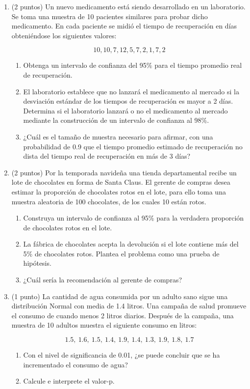 \documentclass[12pt]{article}
\begin{document}
\begin{enumerate}
    \item (2 puntos) Un nuevo medicamento está siendo desarrollado en un laboratorio. Se toma una muestra de 10 pacientes similares para probar dicho medicamento. En cada paciente se midió el tiempo de recuperación en días obteniéndose los siguientes valores:

    \[
    10, 10, 7, 12, 5, 7, 2, 1, 7, 2
    \]

    \begin{enumerate}
        \item Obtenga un intervalo de confianza del 95\% para el tiempo promedio real de recuperación.
        \item El laboratorio establece que no lanzará el medicamento al mercado si la desviación estándar de los tiempos de recuperación es mayor a 2 días. Determina si el laboratorio lanzará o no el medicamento al mercado mediante la construcción de un intervalo de confianza al 98\%.
        \item ¿Cuál es el tamaño de muestra necesario para afirmar, con una probabilidad de 0.9 que el tiempo promedio estimado de recuperación no dista del tiempo real de recuperación en más de 3 días?
    \end{enumerate}

    \item (2 puntos) Por la temporada navideña una tienda departamental recibe un lote de chocolates en forma de Santa Claus. El gerente de compras desea estimar la proporción de chocolates rotos en el lote, para ello toma una muestra aleatoria de 100 chocolates, de los cuales 10 están rotos.

    \begin{enumerate}
        \item Construya un intervalo de confianza al 95\% para la verdadera proporción de chocolates rotos en el lote.
        \item La fábrica de chocolates acepta la devolución si el lote contiene más del 5\% de chocolates rotos. Plantea el problema como una prueba de hipótesis.
        \item ¿Cuál sería la recomendación al gerente de compras?
    \end{enumerate}

    \item (1 punto) La cantidad de agua consumida por un adulto sano sigue una distribución Normal con media de 1.4 litros. Una campaña de salud promueve el consumo de cuando menos 2 litros diarios. Después de la campaña, una muestra de 10 adultos muestra el siguiente consumo en litros:

    \[
    1.5,\ 1.6,\ 1.5,\ 1.4,\ 1.9,\ 1.4,\ 1.3,\ 1.9,\ 1.8,\ 1.7
    \]

    \begin{enumerate}
        \item Con el nivel de significancia de 0.01, ¿se puede concluir que se ha incrementado el consumo de agua?
        \item Calcule e interprete el valor-p.
    \end{enumerate}
\end{enumerate}
\end{document}
